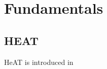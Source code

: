 \section{Fundamentals}
\label{sec:fundamentals}

\subsection{HEAT}
\label{ssec:heat}
\gls{HeAT} is introduced in \cite{krajsek_helmholtz_nodate}